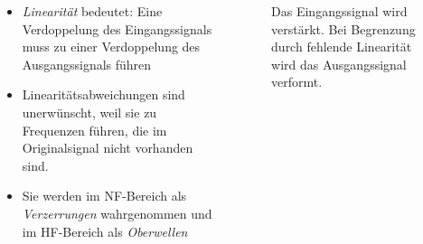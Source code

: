 \begin{frame}
\begin{columns}
    \begin{column}{0.48\textwidth}
    \begin{itemize}
  \item \emph{Linearität} bedeutet: Eine Verdoppelung des Eingangssignals muss zu einer Verdoppelung des Ausgangssignals führen
  \item Linearitätsabweichungen sind unerwünscht, weil sie zu Frequenzen führen, die im Originalsignal nicht vorhanden sind.
  \item Sie werden im NF-Bereich als \emph{Verzerrungen} wahrgenommen und im HF-Bereich als \emph{Oberwellen}
  \end{itemize}

    \end{column}
   \begin{column}{0.48\textwidth}
       
\begin{figure}
    \caption{\scriptsize Das Eingangssignal wird verstärkt. Bei Begrenzung durch fehlende Linearität wird das Ausgangssignal verformt.}
    \label{e_verstaerker_linearitaet}
\end{figure}


   \end{column}
\end{columns}

\end{frame}

\begin{frame}
\end{frame}

